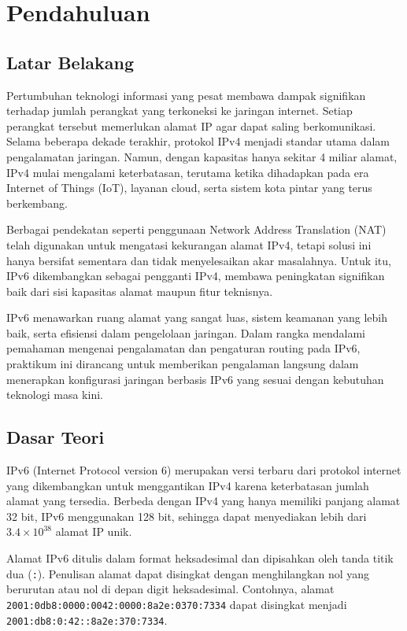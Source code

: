 \section{Pendahuluan}
\subsection{Latar Belakang}
Pertumbuhan teknologi informasi yang pesat membawa dampak signifikan terhadap jumlah perangkat yang terkoneksi ke jaringan internet. Setiap perangkat tersebut memerlukan alamat IP agar dapat saling berkomunikasi. Selama beberapa dekade terakhir, protokol IPv4 menjadi standar utama dalam pengalamatan jaringan. Namun, dengan kapasitas hanya sekitar 4 miliar alamat, IPv4 mulai mengalami keterbatasan, terutama ketika dihadapkan pada era Internet of Things (IoT), layanan cloud, serta sistem kota pintar yang terus berkembang.

Berbagai pendekatan seperti penggunaan Network Address Translation (NAT) telah digunakan untuk mengatasi kekurangan alamat IPv4, tetapi solusi ini hanya bersifat sementara dan tidak menyelesaikan akar masalahnya. Untuk itu, IPv6 dikembangkan sebagai pengganti IPv4, membawa peningkatan signifikan baik dari sisi kapasitas alamat maupun fitur teknisnya.

IPv6 menawarkan ruang alamat yang sangat luas, sistem keamanan yang lebih baik, serta efisiensi dalam pengelolaan jaringan. Dalam rangka mendalami pemahaman mengenai pengalamatan dan pengaturan routing pada IPv6, praktikum ini dirancang untuk memberikan pengalaman langsung dalam menerapkan konfigurasi jaringan berbasis IPv6 yang sesuai dengan kebutuhan teknologi masa kini.

\subsection{Dasar Teori}
IPv6 (Internet Protocol version 6) merupakan versi terbaru dari protokol internet yang dikembangkan untuk menggantikan IPv4 karena keterbatasan jumlah alamat yang tersedia. Berbeda dengan IPv4 yang hanya memiliki panjang alamat 32 bit, IPv6 menggunakan 128 bit, sehingga dapat menyediakan lebih dari $3.4 \times 10^{38}$ alamat IP unik.

Alamat IPv6 ditulis dalam format heksadesimal dan dipisahkan oleh tanda titik dua (\texttt{:}). Penulisan alamat dapat disingkat dengan menghilangkan nol yang berurutan atau nol di depan digit heksadesimal. Contohnya, alamat \texttt{2001:0db8:0000:0042:0000:8a2e:0370:7334} dapat disingkat menjadi \texttt{2001:db8:0:42::8a2e:370:7334}.

